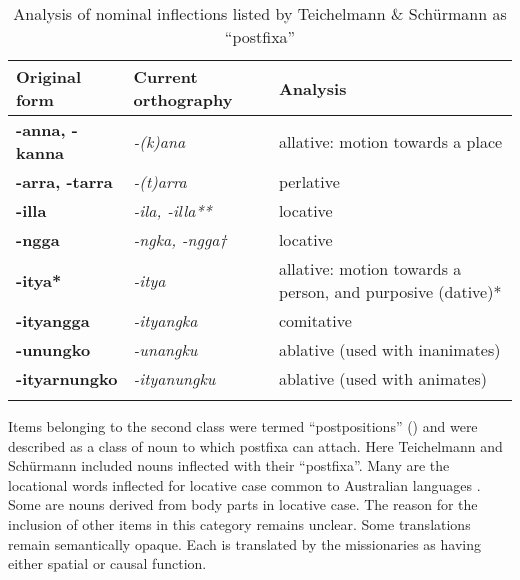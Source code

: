 \begin{table}[b]
	\small
    \begin{tabularx}{\textwidth}{llQ}
        \lsptoprule
        Original form & Current orthography &  Analysis \citep[122--123]{amery_kulurdu_2013}\\
        \midrule 
        \textbf{-anna, -kanna} & \textit{-(k)ana} & allative: motion towards a place\\
        \textbf{-arra, -tarra} & \textit{-(t)arra} & perlative\\
        \textbf{-illa} & \textit{-ila, -illa**} & locative\\
        \textbf{-ngga} & \textit{-ngka, -ngga†} & locative\\
        \textbf{-itya*} & \textit{-itya} & allative: motion towards a person, and purposive (dative)*\\
        \textbf{-ityangga} & \textit{-ityangka} & comitative\\
        \textbf{-unungko} & \textit{-unangku} & ablative (used with inanimates)\\
        \textbf{-ityarnungko} & \textit{-ityanungku} & ablative (used with animates)\\
        \lspbottomrule
    \end{tabularx}
    \caption{\label{tab:5:81} Analysis of nominal inflections listed by Teichelmann \& Schürmann as ``postfixa''}
    \label{tab:chap5:ortho}
\end{table}


    
    
Items belonging to the second class were termed “postpositions” () and were described as a class of noun to which postfixa can attach. Here Teichelmann and Schürmann included nouns inflected with their ``postfixa''. Many are the locational words inflected for locative case common to Australian languages \citep[68]{dixon_preface_2002}. Some are nouns derived from body parts in locative case. The reason for the inclusion of other items in this category remains unclear. Some translations remain semantically opaque. Each is translated by the missionaries as having either spatial or causal function.

